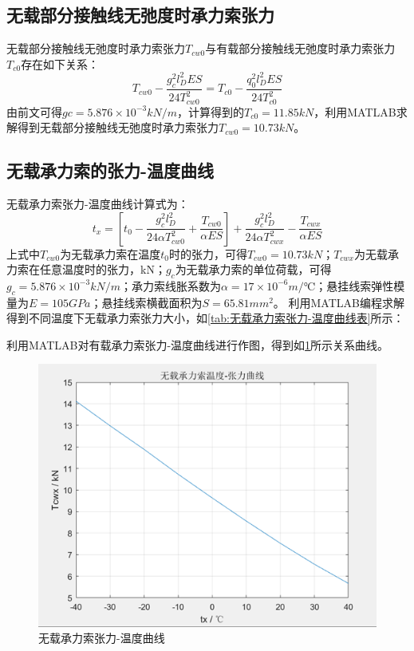 \subsection{无载部分接触线无弛度时承力索张力}
无载部分接触线无弛度时承力索张力$T_{cw0}$与有载部分接触线无弛度时承力索张力$T_{c0}$存在如下关系：
$$
T_{cw0}-\frac{g_{c}^{2}l_{D}^{2}ES}{24T_{cw0}^{2}}=T_{c0}-\frac{q_{0}^{2}l_{D}^{2}ES}{24T_{c0}^{2}}
$$
由前文可得$gc=5.876×10^{-3} kN/m$，计算得到的$T_{c0}=11.85 kN$，利用MATLAB求解得到无载部分接触线无弛度时承力索张力$T_{cw0}=10.73 kN$。
\subsection{无载承力索的张力-温度曲线}
无载承力索张力-温度曲线计算式为：
$$
t_x=[t_0-\frac{g_{c}^{2}l_{D}^{2}}{24\alpha T_{cw0}^{2}}+\frac{T_{cw0}}{\alpha ES}]+\frac{g_{c}^{2}l_{D}^{2}}{24\alpha T_{cwx}^{2}}-\frac{T_{cwx}}{\alpha ES}
$$
上式中$T_{cw0}$为无载承力索在温度$t_0$时的张力，可得$T_{cw0}=10.73kN$；$T_{cwx}$为无载承力索在任意温度时的张力，kN；$g_c$为无载承力索的单位荷载，可得$g_c=5.876×10^{-3} kN/m$；承力索线胀系数为$\alpha=17×10^{-6} m/℃$；悬挂线索弹性模量为$E=105GPa$；悬挂线索横截面积为$S=65.81mm^2$。
利用MATLAB编程求解得到不同温度下无载承力索张力大小，如\ref{tab:无载承力索张力-温度曲线表}所示：
\begin{table}[h]
	\centering
	\caption{无载承力索张力-温度曲线表}
	\label{tab:无载承力索张力-温度曲线表}
\end{table}
利用MATLAB对有载承力索张力-温度曲线进行作图，得到如\ref{fig:-无载承力索张力-温度曲线}所示关系曲线。
\begin{figure}[H]
	\centering
	\includegraphics[width=0.7\linewidth]{figures/无载承力索张力-温度曲线}
	\caption{无载承力索张力-温度曲线}
	\label{fig:-无载承力索张力-温度曲线}
\end{figure}

